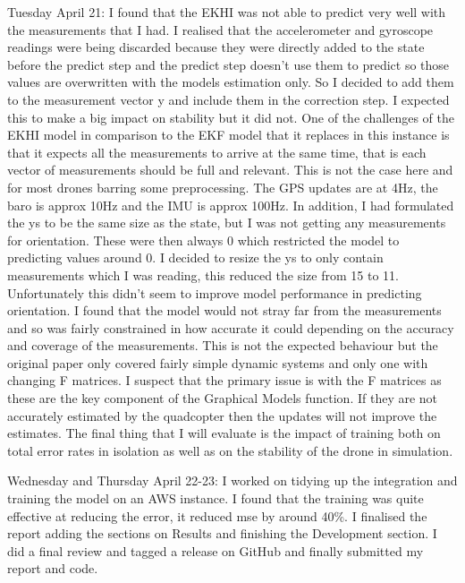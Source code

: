 \documentclass[]{../resources/final_report}
\begin{document}
\begin{appendices}
  Tuesday April 21: I found that the EKHI was not able to predict very well with the measurements that I had. I realised that the accelerometer and gyroscope readings were being discarded because they were directly added to the state before the predict step and the predict step doesn’t use them to predict so those values are overwritten with the models estimation only. So I decided to add them to the measurement vector y and include them in the correction step. I expected this to make a big impact on stability but it did not. One of the challenges of the EKHI model in comparison to the EKF model that it replaces in this instance is that it expects all the measurements to arrive at the same time, that is each vector of measurements should be full and relevant. This is not the case here and for most drones barring some preprocessing. The GPS updates are at 4Hz, the baro is approx 10Hz and the IMU is approx 100Hz. In addition, I had formulated the ys to be the same size as the state, but I was not getting any measurements for orientation. These were then always 0 which restricted the model to predicting values around 0. I decided to resize the ys to only contain measurements which I was reading, this reduced the size from 15 to 11. Unfortunately this didn’t seem to improve model performance in predicting orientation. I found that the model would not stray far from the measurements and so was fairly constrained in how accurate it could depending on the accuracy and coverage of the measurements. This is not the expected behaviour but the original paper only covered fairly simple dynamic systems and only one with changing F matrices. I suspect that the primary issue is with the F matrices as these are the key component of the Graphical Models function. If they are not accurately estimated by the quadcopter then the updates will not improve the estimates. The final thing that I will evaluate is the impact of training both on total error rates in isolation as well as on the stability of the drone in simulation.

  Wednesday and Thursday April 22-23: I worked on tidying up the integration and training the model on an AWS instance. I found that the training was quite effective at reducing the error, it reduced mse by around 40\%. I finalised the report adding the sections on Results and finishing the Development section. I did a final review and tagged a release on GitHub and finally submitted my report and code.

  
\end{appendices}
  
\end{document}
